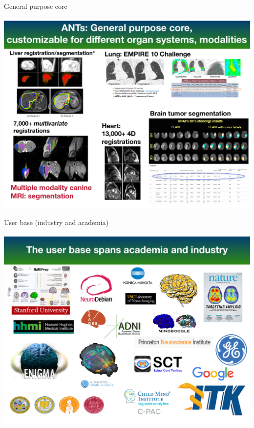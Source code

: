 \documentclass[ignorenonframetext,]{beamer}
\begin{document}
\begin{frame}{General purpose core}

\vspace*{-.225cm} \hspace*{-.5cm}
\includegraphics[width=1.07\textwidth,height=0.92\textheight]{../../Figures/antsGeneralPurpose.pdf}

\end{frame}

\begin{frame}{User base (industry and academia)}

\vspace*{-.225cm} \hspace*{-.5cm}
\includegraphics[width=1.07\textwidth,height=0.92\textheight]{../../Figures/userbase.pdf}

\end{frame}
\end{document}
